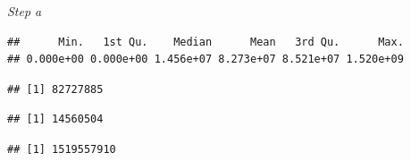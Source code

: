 \documentclass[
]{article}
\newenvironment{Shaded}{\begin{snugshade}}{\end{snugshade}}
\newcommand{\CommentTok}[1]{\textcolor[rgb]{0.56,0.35,0.01}{\textit{#1}}}
\newcommand{\FunctionTok}[1]{\textcolor[rgb]{0.13,0.29,0.53}{\textbf{#1}}}
\newcommand{\NormalTok}[1]{#1}
\newcommand{\SpecialCharTok}[1]{\textcolor[rgb]{0.81,0.36,0.00}{\textbf{#1}}}
\begin{document}
\emph{Step a}

\begin{Shaded}
\end{Shaded}

\begin{verbatim}
##      Min.   1st Qu.    Median      Mean   3rd Qu.      Max. 
## 0.000e+00 0.000e+00 1.456e+07 8.273e+07 8.521e+07 1.520e+09
\end{verbatim}

\begin{Shaded}
\end{Shaded}

\begin{verbatim}
## [1] 82727885
\end{verbatim}

\begin{Shaded}
\end{Shaded}

\begin{verbatim}
## [1] 14560504
\end{verbatim}

\begin{Shaded}
\end{Shaded}

\begin{verbatim}
## [1] 1519557910
\end{verbatim}

\begin{Shaded}
\end{Shaded}
\end{document}
